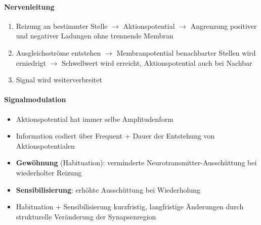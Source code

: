 \paragraph{Nervenleitung}
\begin{enumerate}
  \item Reizung an bestimmter Stelle \( \to \) Aktionspotential \( \to \)  Angrenzung positiver und negativer Ladungen ohne trennende Membran
  \item Ausgleichsströme entstehen \( \to \) Membranpotential benachbarter Stellen wird erniedrigt \( \to \) Schwellwert wird erreicht, Aktionspotential auch bei Nachbar
  \item Signal wird weiterverbreitet
\end{enumerate}

\paragraph{Signalmodulation}
\begin{itemize}
  \item Aktionspotential hat immer selbe Amplitudenform
  \item Information codiert über Frequent + Dauer der Entstehung von Aktionspotentialen
  \item \textbf{Gewöhnung} (Habituation): verminderte Neurotransmitter-Ausschüttung bei wiederholter Reizung
  \item \textbf{Sensibilisierung}: erhöhte Ausschüttung bei Wiederholung
  \item Habituation + Sensibilisierung kurzfristig, langfristige Änderungen durch strukturelle Veränderung der Synapsenregion
\end{itemize}

